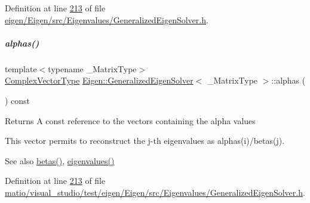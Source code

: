 Definition at line \hyperlink{eigen_2_eigen_2src_2_eigenvalues_2_generalized_eigen_solver_8h_source_l00213}{213} of file \hyperlink{eigen_2_eigen_2src_2_eigenvalues_2_generalized_eigen_solver_8h_source}{eigen/\+Eigen/src/\+Eigenvalues/\+Generalized\+Eigen\+Solver.\+h}.

\mbox{\label{group___eigenvalues___module_a82b1bc41267f46e5c5899d5b084a73bb}} 
\subparagraph{\texorpdfstring{alphas()}{alphas()}\hspace{0.1cm}{\footnotesize\ttfamily [2/2]}}
{\footnotesize\ttfamily template$<$typename \+\_\+\+Matrix\+Type$>$ \\
\hyperlink{group___eigenvalues___module_acfd144329aca76882069da2fc5d53ef5}{Complex\+Vector\+Type} \hyperlink{group___eigenvalues___module_class_eigen_1_1_generalized_eigen_solver}{Eigen\+::\+Generalized\+Eigen\+Solver}$<$ \+\_\+\+Matrix\+Type $>$\+::alphas (\begin{DoxyParamCaption}{ }\end{DoxyParamCaption}) const\hspace{0.3cm}{\ttfamily [inline]}}

\begin{DoxyReturn}{Returns}
A const reference to the vectors containing the alpha values
\end{DoxyReturn}
This vector permits to reconstruct the j-\/th eigenvalues as alphas(i)/betas(j).

\begin{DoxySeeAlso}{See also}
\hyperlink{group___eigenvalues___module_abeaa6f56cee367b83fd09d428462ca0c}{betas()}, \hyperlink{group___eigenvalues___module_a62f01cd78271efd5e39bcb24e0fe1a58}{eigenvalues()} 
\end{DoxySeeAlso}


Definition at line \hyperlink{matio_2visual__studio_2test_2eigen_2_eigen_2src_2_eigenvalues_2_generalized_eigen_solver_8h_source_l00213}{213} of file \hyperlink{matio_2visual__studio_2test_2eigen_2_eigen_2src_2_eigenvalues_2_generalized_eigen_solver_8h_source}{matio/visual\+\_\+studio/test/eigen/\+Eigen/src/\+Eigenvalues/\+Generalized\+Eigen\+Solver.\+h}.

